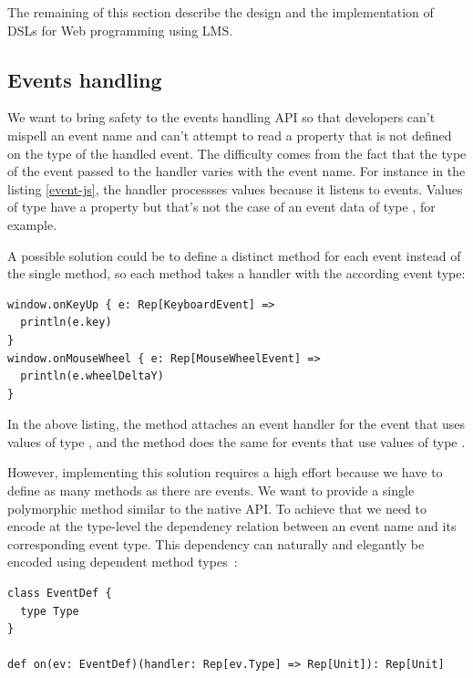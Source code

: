 \documentclass[american,english,runningheads]{llncs}
\begin{document}
The remaining of this section describe the design and the implementation of DSLs for Web programming using LMS.

\subsection{Events handling}

We want to bring safety to the events handling API so that developers can’t mispell an event name and can’t attempt
to read a property that is not defined on the type of the handled event. The difficulty comes from the fact that the
type of the event passed to the handler varies with the event name. For instance in the listing \ref{event-js}, the
handler processses  values because it listens to  events. Values of type
 have a property  but that’s not the case of an event data of type
, for example.

A possible solution could be to define a distinct method for each event instead of the single 
method, so each method takes a handler with the according event type:

\begin{lstlisting}
window.onKeyUp { e: Rep[KeyboardEvent] =>
  println(e.key)
}
window.onMouseWheel { e: Rep[MouseWheelEvent] =>
  println(e.wheelDeltaY)
}
\end{lstlisting}

In the above listing, the  method attaches an event handler for the  event that uses values
of type , and the  method does the same for  events that use
values of type .

However, implementing this solution requires a high effort because we have to define as many methods as there are
events. We want to provide a single polymorphic method similar to the native API. To achieve that we need to encode
at the type-level the dependency relation between an event name and its corresponding event type. This dependency can
naturally and elegantly be encoded using dependent method types~\cite{Oliveira10_Typeclasses}:

\begin{lstlisting}
class EventDef {
  type Type
}

def on(ev: EventDef)(handler: Rep[ev.Type] => Rep[Unit]): Rep[Unit]
\end{lstlisting}
\end{document}
